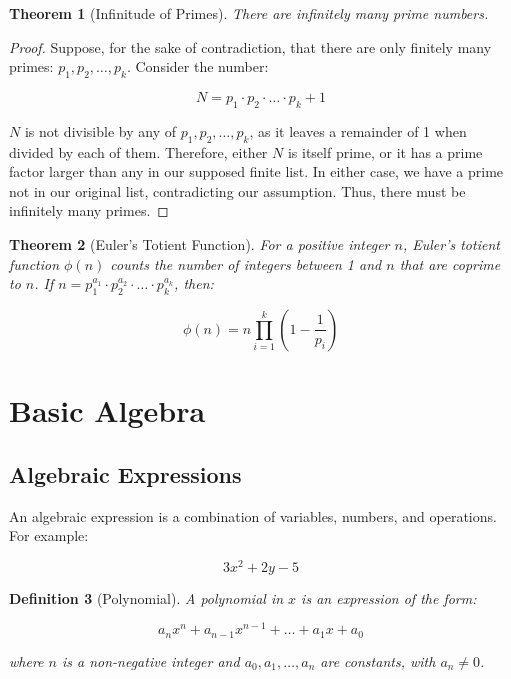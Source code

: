 \documentclass[12pt]{article}
\newif\ifDarkMode
\newcommand{\eqcolor}[1]{\ifDarkMode\textcolor{draculaPurple}{#1}\else#1\fi}
\newcommand{\varcolor}[1]{\ifDarkMode\textcolor{draculaGreen}{#1}\else#1\fi}
\newtheorem{theorem}{Theorem}[section]
\newtheorem{definition}[theorem]{Definition}
\begin{document}
\begin{theorem}[Infinitude of Primes]
There are infinitely many prime numbers.
\end{theorem}

\begin{proof}
Suppose, for the sake of contradiction, that there are only finitely many primes: $\varcolor{p_1}, \varcolor{p_2}, \ldots, \varcolor{p_k}$. Consider the number:

\[
\eqcolor{N = p_1 \cdot p_2 \cdot \ldots \cdot p_k + 1}
\]

$\varcolor{N}$ is not divisible by any of $\varcolor{p_1}, \varcolor{p_2}, \ldots, \varcolor{p_k}$, as it leaves a remainder of 1 when divided by each of them. Therefore, either $\varcolor{N}$ is itself prime, or it has a prime factor larger than any in our supposed finite list. In either case, we have a prime not in our original list, contradicting our assumption. Thus, there must be infinitely many primes.
\end{proof}

\begin{theorem}[Euler's Totient Function]
For a positive integer $\varcolor{n}$, Euler's totient function $\varcolor{\phi(n)}$ counts the number of integers between 1 and $\varcolor{n}$ that are coprime to $\varcolor{n}$. If $\varcolor{n = p_1^{a_1} \cdot p_2^{a_2} \cdot \ldots \cdot p_k^{a_k}}$, then:

\[
\eqcolor{\phi(n) = n \prod_{i=1}^k \left(1 - \frac{1}{p_i}\right)}
\]
\end{theorem}

\section{\textcolor{draculaCyan}{Basic Algebra}}

\subsection{\textcolor{draculaYellow}{Algebraic Expressions}}

An algebraic expression is a combination of variables, numbers, and operations. For example:

\[
\eqcolor{3x^2 + 2y - 5}
\]

\begin{definition}[Polynomial]
A polynomial in $\varcolor{x}$ is an expression of the form:

\[
\eqcolor{a_nx^n + a_{n-1}x^{n-1} + \ldots + a_1x + a_0}
\]

where $\varcolor{n}$ is a non-negative integer and $\varcolor{a_0}, \varcolor{a_1}, \ldots, \varcolor{a_n}$ are constants, with $\varcolor{a_n \neq 0}$.
\end{definition}
\end{document}
